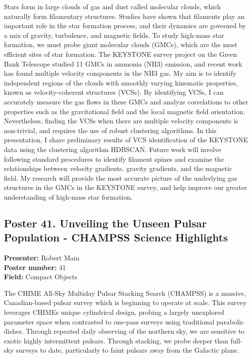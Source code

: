 Stars form in large clouds of gas and dust called molecular clouds, which naturally form filamentary structures. Studies have shown that filaments play an important role in the star formation process, and their dynamics are governed by a mix of gravity, turbulence, and magnetic fields. To study high-mass star formation, we must probe giant molecular clouds (GMCs), which are the most efficient sites of star formation. The KEYSTONE survey project on the Green Bank Telescope studied 11 GMCs in ammonia (NH3) emission, and recent work has found multiple velocity components in the NH3 gas. My aim is to identify independent regions of the clouds with smoothly varying kinematic properties, known as velocity-coherent structures (VCSs). By identifying VCSs, I can accurately measure the gas flows in these GMCs and analyze correlations to other properties such as the gravitational field and the local magnetic field orientation. Nevertheless, finding the VCSs when there are multiple velocity components is non-trivial, and requires the use of robust clustering algorithms. In this presentation, I share preliminary results of VCS identification of the KEYSTONE data using the clustering algorithm HDBSCAN. Future work will involve following standard procedures to identify filament spines and examine the relationships between velocity gradients, gravity gradients, and the magnetic field. My research will provide the most accurate picture of the underlying gas structures in the GMCs in the KEYSTONE survey, and help improve our greater understanding of high-mass star formation.

\hypertarget{poster-abstract-talk-209}{}\label{poster-abstract-page-talk-209}
\subsection*{Poster 41. Unveiling the Unseen Pulsar Population - CHAMPSS Science Highlights}
\textbf{Presenter:} Robert Main\\
\textbf{Poster number:} 41\\
\textbf{Field:} Compact Objects

The CHIME All-Sky Multiday Pulsar Stacking Search (CHAMPSS) is a massive, Canadian-based pulsar survey which is beginning to operate at scale. This survey leverages CHIMEs unique cylindrical design, probing a largely unexplored parameter space when contrasted to one-pass surveys using traditional parabolic dishes. Through repeated daily observing of the northern sky, we are sensitive to exotic highly intermittent pulsars. Through stacking, we probe deeper than full-sky surveys to date, particularly to faint pulsars away from the Galactic plane.

